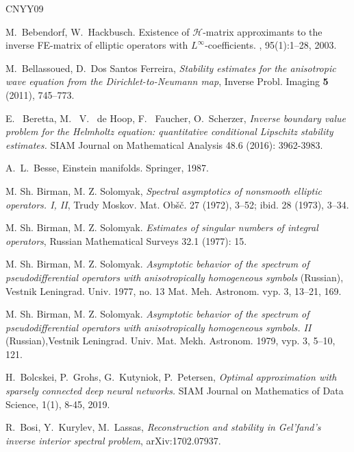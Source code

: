 \documentclass[12pt,twoside]{amsart}
\numberwithin{equation}{section}
\begin{document}
\begin{thebibliography}{CNYY09}
  
  
M.\ Bebendorf, W.\ Hackbusch.
\newblock Existence of $\mathcal{H}$-matrix approximants to the inverse
  {F}{E}-matrix of elliptic operators with {$L^{\infty}$}-coefficients.
, 95(1):1--28, 2003. 

M.\ Bellassoued, D.\ Dos Santos Ferreira, \textit{{Stability estimates for the anisotropic wave equation from the Dirichlet-to-Neumann map}}, Inverse Probl. Imaging {\bf 5} (2011), 745--773.


E. \ Beretta, M. \ V. \ de Hoop, F. \ Faucher, O.\ Scherzer, 
\textit{{Inverse boundary value problem for the Helmholtz equation: quantitative conditional Lipschitz stability estimates.}} 
SIAM Journal on Mathematical Analysis 48.6 (2016): 3962-3983.



A.\ L.\ Besse, Einstein manifolds. Springer, 1987.



M. Sh. Birman, M. Z. Solomyak, \textit{{Spectral asymptotics of nonsmooth elliptic operators. {I},
              {II}}}, Trudy Moskov. Mat. Ob\v{s}\v{c}. 27 (1972), 3--52; ibid. 28 (1973), 3--34.

M. Sh. Birman, M. Z. Solomyak. \textit{{Estimates of singular numbers of integral operators}}, Russian Mathematical Surveys 32.1 (1977): 15.

M. Sh. Birman, M. Z. Solomyak. \textit{{Asymptotic behavior of the spectrum of pseudodifferential operators with anisotropically homogeneous symbols}} (Russian), Vestnik Leningrad. Univ. 1977, no. 13 Mat. Meh. Astronom. vyp. 3, 13--21, 169. 

M. Sh. Birman, M. Z. Solomyak. \textit{{Asymptotic behavior of the spectrum of pseudodifferential operators with anisotropically homogeneous symbols. II}} (Russian),Vestnik Leningrad. Univ. Mat. Mekh. Astronom. 1979, vyp. 3, 5--10, 121. 


H.\ Bolcskei, P.\ Grohs, G.\ Kutyniok, P.\ Petersen, \emph{Optimal approximation with sparsely connected deep neural networks.} SIAM Journal on Mathematics of Data Science, 1(1), 8-45, 2019.

R.\ Bosi, Y.\ Kurylev, M.\ Lassas, \textit{{Reconstruction and stability in Gel'fand's inverse interior spectral problem}}, arXiv:1702.07937.



\end{thebibliography}
\end{document}
